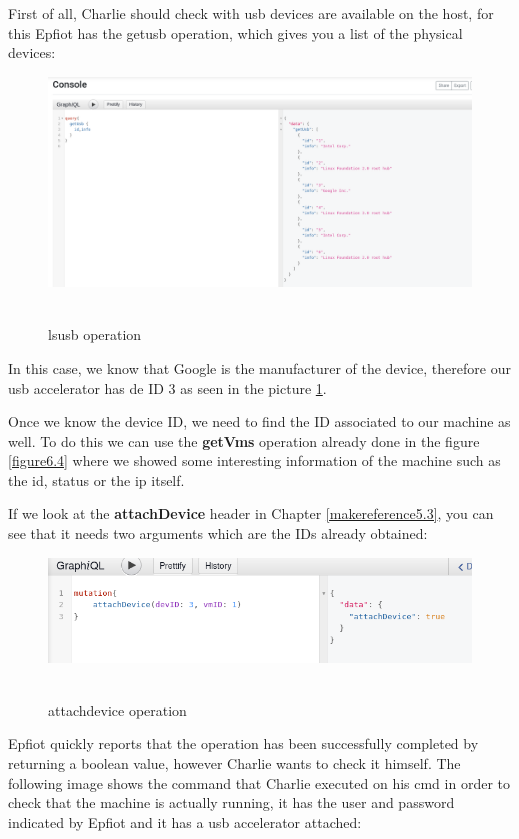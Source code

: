 First of all, Charlie should check with usb devices are available on the host, for this Epfiot has the getusb operation, which gives you a list of the physical devices:
\begin{figure}[h!]%
\centering
    \includegraphics[width=7.0in]{figures/lsusb.png}
~\caption{lsusb operation}
\label{figure6.5}
\end{figure}
\newpage

In this case, we know that Google is the manufacturer of the device, therefore our usb accelerator has de ID 3 as seen in the picture \ref{figure6.5}.

Once we know the device ID, we need to find the ID associated to our machine as well. To do this we can use the \textbf{getVms} operation already done in the figure \ref{figure6.4} where we showed some interesting information of the machine such as the id, status or the ip itself.

If we look at the \textbf{attachDevice} header in Chapter \ref{makereference5.3}, you can see that it needs two arguments which are the IDs already obtained:
\begin{figure}[h!]%
\centering
    \includegraphics[width=4.5in]{figures/attach_dev.png}
~\caption{attachdevice operation}
\label{figure6.6}
\end{figure}

Epfiot quickly reports that the operation has been successfully completed by returning a boolean value, however Charlie wants to check it himself.
The following image shows the command that Charlie executed on his cmd in order to check that the machine is actually running, it has the user and password indicated by Epfiot and it has a usb accelerator attached:

